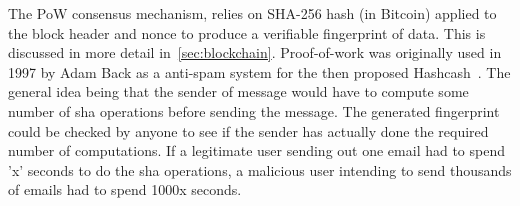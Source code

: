 The PoW consensus mechanism, relies on SHA-256 hash (in Bitcoin)
applied to the block header and nonce to produce a verifiable fingerprint of
data. This is discussed in more detail in~\ref{sec:blockchain}. Proof-of-work
was originally used in 1997 by Adam Back as a anti-spam system for the then
proposed Hashcash~\cite{back2002hashcash}. The general idea being that the
sender of message would have to compute some number of sha operations before
sending the message.  The generated fingerprint could be checked by anyone to
see if the sender has actually done the required number of computations. If a
legitimate user sending out one email had to spend 'x' seconds to do the sha
operations, a malicious user intending to send thousands of emails had to spend
1000x seconds. \\



%

